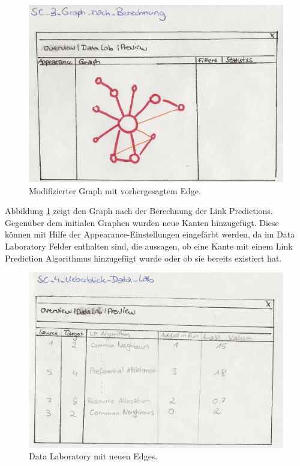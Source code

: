\begin{figure}
    \includegraphics[width=\linewidth]{resources/SC-3.png}
    \caption{Modifizierter Graph mit vorhergesagtem Edge.}
    \label{fig:screen3}
\end{figure}

Abbildung \ref{fig:screen3} zeigt den Graph nach der Berechnung der Link Predictions.
Gegenüber dem initialen Graphen wurden neue Kanten hinzugefügt.
Diese können mit Hilfe der Appearance-Einstellungen eingefärbt werden, da im Data Laboratory Felder enthalten sind, die aussagen, ob eine
Kante mit einem Link Prediction Algorithmus hinzugefügt wurde oder ob sie bereits existiert hat.

\begin{figure}
    \includegraphics[width=\linewidth]{resources/SC-4.png}
    \caption{Data Laboratory mit neuen Edges.}
    \label{fig:screen4}
\end{figure}

